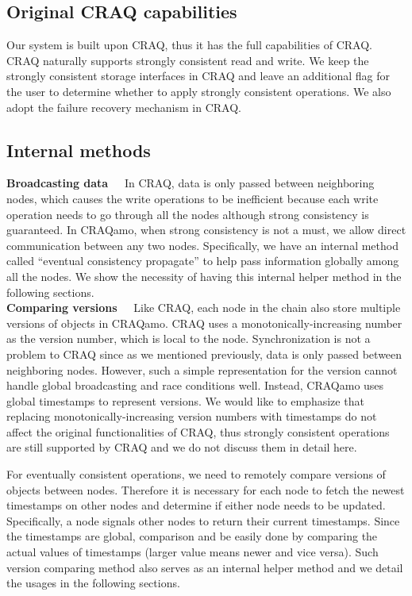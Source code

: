 \subsection{Original CRAQ capabilities}
Our system is built upon CRAQ, thus it has the full capabilities of CRAQ. CRAQ naturally supports strongly consistent read and write. We keep the strongly consistent storage interfaces in CRAQ and leave an additional flag for the user to determine whether to apply strongly consistent operations. We also adopt the failure recovery mechanism in CRAQ.

\subsection{Internal methods}
{\noindent \bf Broadcasting data\ \ } In CRAQ, data is only passed between neighboring nodes, which causes the write operations to be inefficient because each write operation needs to go through all the nodes although strong consistency is guaranteed. In CRAQamo, when strong consistency is not a must, we allow direct communication between any two nodes. Specifically, we have an internal method called ``eventual consistency propagate'' to help pass information globally among all the nodes. We show the necessity of having this internal helper method in the following sections. \\

{\noindent \bf Comparing versions\ \ } Like CRAQ, each node in the chain also store multiple versions of objects in CRAQamo. CRAQ uses a monotonically-increasing number as the version number, which is local to the node. Synchronization is not a problem to CRAQ since as we mentioned previously, data is only passed between neighboring nodes. However, such a simple representation for the version cannot handle global broadcasting and race conditions well. Instead, CRAQamo uses global timestamps to represent versions. We would like to emphasize that replacing monotonically-increasing version numbers with timestamps do not affect the original functionalities of CRAQ, thus strongly consistent operations are still supported by CRAQ and we do not discuss them in detail here.

For eventually consistent operations, we need to remotely compare versions of objects between nodes. Therefore it is necessary for each node to fetch the newest timestamps on other nodes and determine if either node needs to be updated. Specifically, a node signals other nodes to return their current timestamps. Since the timestamps are global, comparison and be easily done by comparing the actual values of timestamps (larger value means newer and vice versa). Such version comparing method also serves as an internal helper method and we detail the usages in the following sections. 

